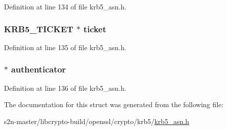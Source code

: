 Definition at line 134 of file krb5\+\_\+asn.\+h.

\subsubsection[{\texorpdfstring{ticket}{ticket}}]{\setlength{\rightskip}{0pt plus 5cm}K\+R\+B5\+\_\+\+T\+I\+C\+K\+ET $\ast$ ticket}\hypertarget{structkrb5__ap__req__st_a836b8bce7aabd280b235c1fb6a2e6336}{}\label{structkrb5__ap__req__st_a836b8bce7aabd280b235c1fb6a2e6336}


Definition at line 135 of file krb5\+\_\+asn.\+h.

\subsubsection[{\texorpdfstring{authenticator}{authenticator}}]{ $\ast$ authenticator}\hypertarget{structkrb5__ap__req__st_a740653bd5aaa3d47bc2af3d1566aa51d}{}\label{structkrb5__ap__req__st_a740653bd5aaa3d47bc2af3d1566aa51d}


Definition at line 136 of file krb5\+\_\+asn.\+h.



The documentation for this struct was generated from the following file\+:\begin{DoxyCompactItemize}
\item 
s2n-\/master/libcrypto-\/build/openssl/crypto/krb5/\hyperlink{crypto_2krb5_2krb5__asn_8h}{krb5\+\_\+asn.\+h}\end{DoxyCompactItemize}

